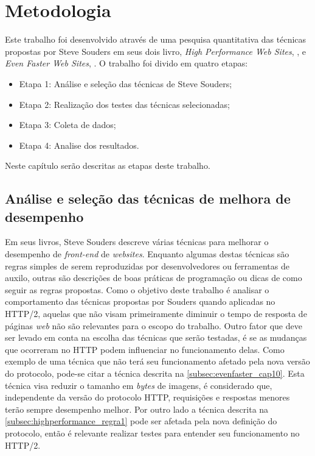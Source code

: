 %
%

\chapter{Metodologia}

Este trabalho foi desenvolvido através de uma pesquisa quantitativa das técnicas propostas por Steve Souders em seus dois livro, \textit{High Performance Web Sites}, \cite{HighPerformance}, e \textit{Even Faster Web Sites}, \cite{EvenFaster}. O trabalho foi divido em quatro etapas:

\begin{itemize}
	\item Etapa 1: Análise e seleção das técnicas de Steve Souders;
	\item Etapa 2: Realização dos testes das técnicas selecionadas;
	\item Etapa 3: Coleta de dados;
	\item Etapa 4: Analise dos resultados.
\end{itemize}

Neste capítulo serão descritas as etapas deste trabalho.

\section{Análise e seleção das técnicas de melhora de desempenho}

Em seus livros, Steve Souders descreve várias técnicas para melhorar o desempenho de \textit{front-end} de \textit{websites}. Enquanto algumas destas técnicas são regras simples de serem reproduzidas por desenvolvedores ou ferramentas de auxilo, outras são descrições de boas práticas de programação ou dicas de como seguir as regras propostas. Como o objetivo deste trabalho é analisar o comportamento das técnicas propostas por Souders quando aplicadas no HTTP/2, aquelas que não visam primeiramente diminuir o tempo de resposta de páginas \textit{web} não são relevantes para o escopo do trabalho. Outro fator que deve ser levado em conta na escolha das técnicas que serão testadas, é se as mudanças que ocorreram no HTTP podem influenciar no funcionamento delas. Como exemplo de uma técnica que não terá seu funcionamento afetado pela nova versão do protocolo, pode-se citar a técnica descrita na \autoref{subsec:evenfaster_cap10}. Esta técnica visa reduzir o tamanho em \textit{bytes} de imagens, é considerado que, independente da versão do protocolo HTTP, requisições e respostas menores terão sempre desempenho melhor. Por outro lado a técnica descrita na \autoref{subsec:highperformance_regra1} pode ser afetada pela nova definição do protocolo, então é relevante realizar testes para entender seu funcionamento no HTTP/2.

